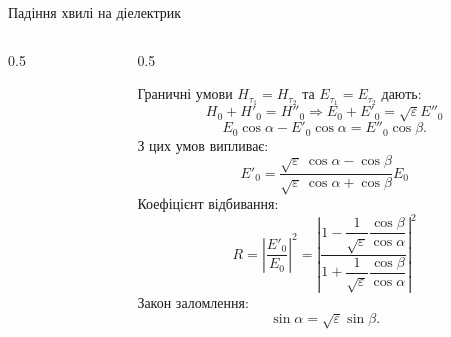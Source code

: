 \documentclass[]{beamer}
\begin{document}
\begin{frame}{Падіння хвилі на діелектрик}{}
	\begin{columns}
		\begin{column}{0.5\linewidth}
			\begin{center}
				
			\end{center}
		\end{column}
		\begin{column}{0.5\linewidth}
			\begin{block}{}\scriptsize
				Граничні умови $H_{\tau_1} = H_{\tau_2}$ та $E_{\tau_1} = E_{\tau_2}$ дають:
				\begin{equation*}
					H_0 + H'_0 = H''_0 \Rightarrow E_0 + E'_0 = \sqrt{\varepsilon} E''_0
				\end{equation*}
				\begin{equation*}
					E_0\cos\alpha - E'_0\cos\alpha = E''_0 \cos\beta.
				\end{equation*}
				З цих умов випливає:
				\begin{equation*}
					E'_0 = \frac{\sqrt{\varepsilon}\ \cos \alpha - \cos\beta}{\sqrt{\varepsilon}\ \cos\alpha + \cos\beta} E_0
				\end{equation*}
				Коефіцієнт відбивання:
				\begin{equation*}
					R = \left|\frac{E'_0}{E_0}\right|^2 = \left|\frac{1 - \dfrac1{\sqrt{\varepsilon}} \dfrac{\cos \beta}{\cos \alpha} }{1 + \dfrac1{\sqrt{\varepsilon}} \dfrac{\cos \beta}{\cos \alpha}}\right|^2
				\end{equation*}
				Закон заломлення:
				\begin{equation*}
					\sin\alpha = \sqrt\varepsilon\sin\beta.
				\end{equation*}
			\end{block}
		\end{column}
	\end{columns}

\end{frame}
\end{document}
